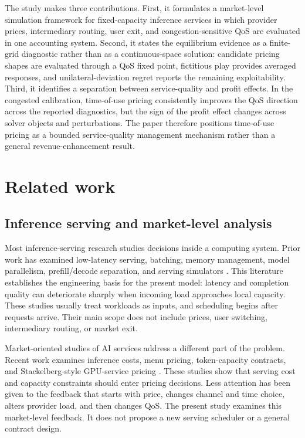 \documentclass[11pt,a4paper]{article}
\begin{document}
The study makes three contributions. First, it formulates a market-level simulation framework for fixed-capacity inference services in which provider prices, intermediary routing, user exit, and congestion-sensitive QoS are evaluated in one accounting system. Second, it states the equilibrium evidence as a finite-grid diagnostic rather than as a continuous-space solution: candidate pricing shapes are evaluated through a QoS fixed point, fictitious play provides averaged responses, and unilateral-deviation regret reports the remaining exploitability. Third, it identifies a separation between service-quality and profit effects. In the congested calibration, time-of-use pricing consistently improves the QoS direction across the reported diagnostics, but the sign of the profit effect changes across solver objects and perturbations. The paper therefore positions time-of-use pricing as a bounded service-quality management mechanism rather than a general revenue-enhancement result.

\section{Related work}
\label{sec:related}

\subsection{Inference serving and market-level analysis}

Most inference-serving research studies decisions inside a computing system. Prior work has examined low-latency serving, batching, memory management, model parallelism, prefill/decode separation, and serving simulators \cite{crankshaw2017clipper,gujarati2020clockwork,romero2021infaas,yu2022orca,li2023alpaserve,sheng2023flexgen,kwon2023pagedattention,agrawal2024sarathiserve,patel2024splitwise,zhong2024distserve,agrawal2024vidur}. This literature establishes the engineering basis for the present model: latency and completion quality can deteriorate sharply when incoming load approaches local capacity. These studies usually treat workloads as inputs, and scheduling begins after requests arrive. Their main scope does not include prices, user switching, intermediary routing, or market exit.

Market-oriented studies of AI services address a different part of the problem. Recent work examines inference costs, menu pricing, token-capacity contracts, and Stackelberg-style GPU-service pricing \cite{demirer2025emerging,erdil2025inference,bergemann2025menu,guo2026prillm,yan2026stackelberg,cunningham2026token,liu2026locational}. These studies show that serving cost and capacity constraints should enter pricing decisions. Less attention has been given to the feedback that starts with price, changes channel and time choice, alters provider load, and then changes QoS. The present study examines this market-level feedback. It does not propose a new serving scheduler or a general contract design.
\end{document}
